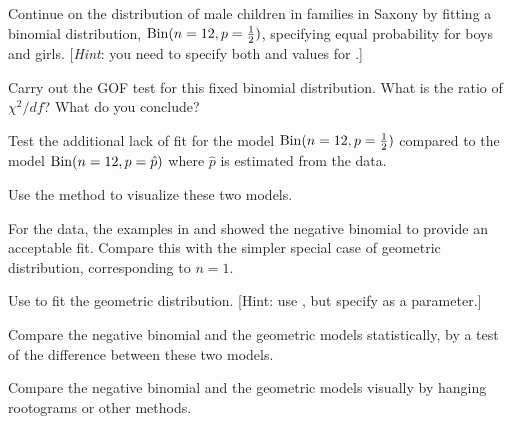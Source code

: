 \documentclass[11pt]{report}\usepackage[]{graphicx}\usepackage[]{color}
\begin{document}
\begin{Exercises}
  \exercise Continue  on the distribution of male children in families
  in Saxony by fitting a binomial distribution, $\Bin(n=12, p=\frac12)$, specifying
  equal probability for boys and girls. [\emph{Hint}:  you need to specify both  and
   values for .]
  \begin{enumerate*}
    \item Carry out the GOF test for this fixed binomial distribution.
    What is the ratio of $\chi^2 / df$? What do you conclude?
    \item Test the additional lack of fit for the model $\Bin(n=12, p=\frac12)$
    compared to the model $\Bin(n=12, p=\hat{p})$ where $\hat{p}$ is estimated
    from the data.
    \item Use the  method to visualize these two models.
  \end{enumerate*}

  \exercise For the  data, the examples in  and
   showed the negative binomial to provide an acceptable fit.
  Compare this with the simpler special case of geometric distribution, corresponding
  to $n=1$.
  \begin{enumerate*}
    \item Use  to fit the geometric distribution. [Hint: use , but specify  as a parameter.]
    \item Compare the negative binomial and the geometric models statistically,
    by a \LR test of the difference between these two models. 
    \item Compare the negative binomial and the geometric models visually
    by hanging rootograms or other methods.
  \end{enumerate*}


\end{Exercises}
\end{document}
